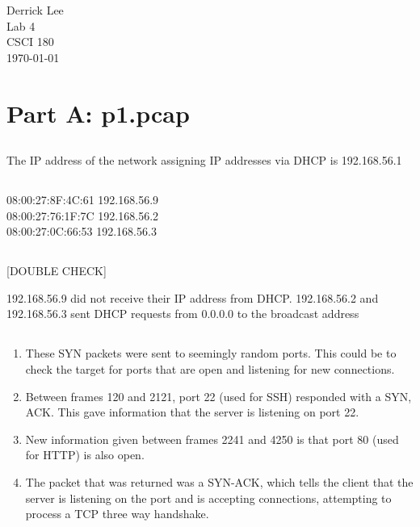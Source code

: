 \documentclass[12pt]{exam}
\begin{document}
\noindent
Derrick Lee\\
Lab 4\\
CSCI 180\\
\today\\

\section{Part A: p1.pcap}

\subsection{}

The IP address of the network assigning IP addresses via DHCP is 192.168.56.1

\subsection{}

08:00:27:8F:4C:61 192.168.56.9 \\
08:00:27:76:1F:7C 192.168.56.2 \\
08:00:27:0C:66:53 192.168.56.3 \\

\subsection{}

[DOUBLE CHECK]

192.168.56.9 did not receive their IP address from DHCP.
192.168.56.2 and 192.168.56.3 sent DHCP requests from 0.0.0.0 to the
broadcast address

\subsection{}

\begin{enumerate}[label=\alph*)]
    \item These SYN packets were sent to seemingly random ports.  This could be
    to check the target for ports that are open and listening for new
    connections.
    \item Between frames 120 and 2121, port 22 (used for SSH) responded with a
    SYN, ACK. This gave information that the server is listening on port 22.
    \item New information given between frames 2241 and 4250 is that port 80
    (used for HTTP) is also open.
    \item The packet that was returned was a SYN-ACK, which tells the client
    that the server is listening on the port and is accepting connections,
    attempting to process a TCP three way handshake.
\end{enumerate}
\end{document}
